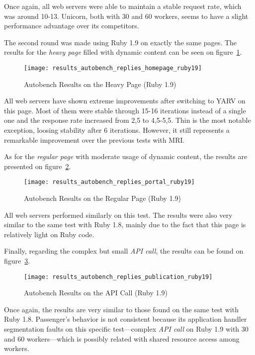 Once again, all web servers were able to maintain a stable request rate, which was around 10-13. Unicorn, both with 30 and 60 workers, seems to have a slight performance advantage over its competitors.

The second round was made using Ruby 1.9 on exactly the same pages. The results for the \textit{heavy page} filled with dynamic content can be seen on figure~\ref{fig:page1_autobench_ruby19_results}.
\begin{figure}[h!t]
  \centering
    \texttt{[image: results\_autobench\_replies\_homepage\_ruby19]}
    \caption{Autobench Results on the Heavy Page (Ruby 1.9)} \label{fig:page1_autobench_ruby19_results}
\end{figure}

All web servers have shown extreme improvements after switching to YARV on this page. Most of them were stable through 15-16 iterations instead of a single one and the response rate increased from 2,5 to 4,5-5,5. Thin is the most notable exception, loosing stability after 6 iterations. However, it still represents a remarkable improvement over the previous tests with MRI.

As for the \textit{regular page} with moderate usage of dynamic content, the results are presented on figure~\ref{fig:page2_autobench_ruby19_results}.
\begin{figure}[h!t]
  \centering
    \texttt{[image: results\_autobench\_replies\_portal\_ruby19]}
    \caption{Autobench Results on the Regular Page (Ruby 1.9)} \label{fig:page2_autobench_ruby19_results}
\end{figure}

All web servers performed similarly on this test. The results were also very similar to the same test with Ruby 1.8, mainly due to the fact that this page is relatively light on Ruby code.

Finally, regarding the complex but small \textit{API call}, the results can be found on figure~\ref{fig:page3_autobench_ruby19_results}.
\begin{figure}[h!t]
  \centering
    \texttt{[image: results\_autobench\_replies\_publication\_ruby19]}
    \caption{Autobench Results on the API Call (Ruby 1.9)} \label{fig:page3_autobench_ruby19_results}
\end{figure}

Once again, the results are very similar to those found on the same test with Ruby 1.8. Passenger's behavior is not consistent because its application handler segmentation faults on this specific test---complex \textit{API call} on Ruby 1.9 with 30 and 60 workers---which is possibly related with shared resource access among workers.

